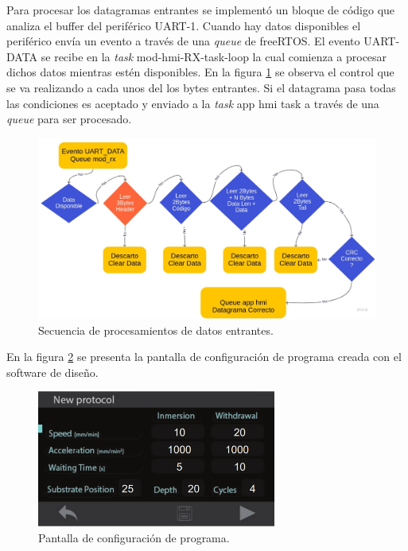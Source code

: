 Para procesar los datagramas entrantes se implementó un bloque de código que analiza el buffer del periférico UART-1. Cuando hay datos disponibles el periférico envía un evento a través de una \textit{queue} de freeRTOS. El evento UART-DATA se recibe en la \textit{task} mod-hmi-RX-task-loop la cual comienza a procesar dichos datos mientras estén disponibles. En la figura \ref{fig:secuencia_a} se observa el control que se va realizando a cada unos del los bytes entrantes. Si el datagrama pasa todas las condiciones es aceptado y enviado a la \textit{task} app hmi task a través de una \textit{queue} para ser procesado.


\begin{figure}[h!]
	\centering
	\includegraphics[width=\textwidth]{./Figures/Secuencia_lectura_uart.jpg}
	\caption{Secuencia de procesamientos de datos entrantes.}
	\label{fig:secuencia_a}
\end{figure}

 
En la figura \ref{fig:stone_a} se presenta la pantalla de configuración de programa creada con el software de diseño. 

\begin{figure}[h!]
	\centering
	\includegraphics[width=0.7\textwidth]{./Figures/pantalla.png}
	\caption{Pantalla de configuración de programa.}
	\label{fig:stone_a}
\end{figure}  

